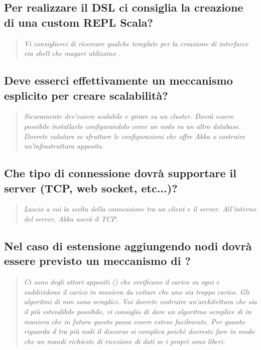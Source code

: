 \documentclass{scalatekids-article}
\begin{document}
\subsection{Per realizzare il DSL ci consiglia la creazione di una custom REPL Scala?}
\begin{quote}
  \textit{Vi consiglierei di ricercare qualche template per la creazione di interfacce via shell che magari utilizzino .\\}
\end{quote}
\subsection{Deve esserci effettivamente un meccanismo esplicito per creare scalabilità?}
\begin{quote}
  \textit{Sicuramente dev'essere scalabile e girare su un cluster. Dovrà essere possibile installarlo configurandolo come un nodo su un altro database. Dovrete valutare se sfruttare le configurazioni che 
  offre Akka o costruire un'infrastruttura apposita.\\}
\end{quote}
\subsection{Che tipo di connessione dovrà supportare il server (TCP, web socket, etc...)?}
\begin{quote}
  \textit{Lascio a voi la scelta della connessione tra un client e il server. All'interno del server, Akka userà il TCP.\\}
\end{quote}
\subsection{Nel caso di estensione aggiungendo nodi dovrà essere previsto un meccanismo di ?}
\begin{quote}
  \textit{Ci sono degli attori appositi () che verificano il carico su ogni  e suddividono il carico in maniera da evitare che uno  sia troppo carico. 
  Gli algoritmi di  non sono semplici. Voi dovrete costruire un'architettura che sia il più estendibile possibile, vi consiglio di dare un algoritmo semplice di  in maniera che in futuro questo possa essere esteso facilmente. Per quanto riguarda il  tra più nodi il discorso si complica poichè dovreste fare in modo che un  mandi richieste di ricezione di dati se i propri  sono liberi.\\}
\end{quote}
\end{document}
